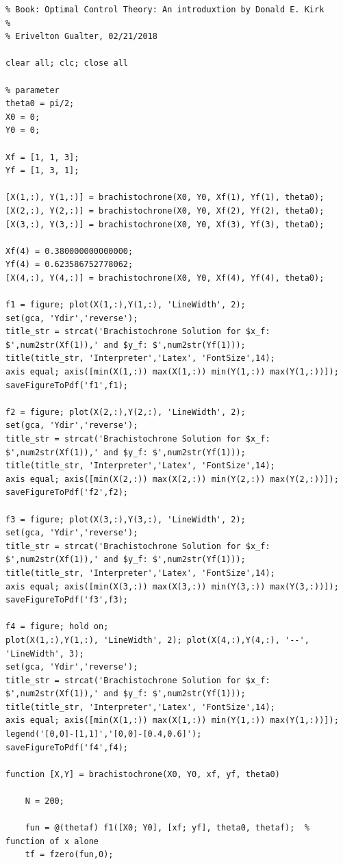\documentclass{article}
\begin{document}
\begin{lstlisting}
% Book: Optimal Control Theory: An introduxtion by Donald E. Kirk
%
% Erivelton Gualter, 02/21/2018

clear all; clc; close all

% parameter
theta0 = pi/2;
X0 = 0; 
Y0 = 0;
    
Xf = [1, 1, 3]; 
Yf = [1, 3, 1];

[X(1,:), Y(1,:)] = brachistochrone(X0, Y0, Xf(1), Yf(1), theta0);
[X(2,:), Y(2,:)] = brachistochrone(X0, Y0, Xf(2), Yf(2), theta0);
[X(3,:), Y(3,:)] = brachistochrone(X0, Y0, Xf(3), Yf(3), theta0);

Xf(4) = 0.380000000000000; 
Yf(4) = 0.623586752778062;
[X(4,:), Y(4,:)] = brachistochrone(X0, Y0, Xf(4), Yf(4), theta0);
    
f1 = figure; plot(X(1,:),Y(1,:), 'LineWidth', 2); 
set(gca, 'Ydir','reverse');
title_str = strcat('Brachistochrone Solution for $x_f: $',num2str(Xf(1)),' and $y_f: $',num2str(Yf(1)));
title(title_str, 'Interpreter','Latex', 'FontSize',14);
axis equal; axis([min(X(1,:)) max(X(1,:)) min(Y(1,:)) max(Y(1,:))]);
saveFigureToPdf('f1',f1);

f2 = figure; plot(X(2,:),Y(2,:), 'LineWidth', 2); 
set(gca, 'Ydir','reverse');
title_str = strcat('Brachistochrone Solution for $x_f: $',num2str(Xf(1)),' and $y_f: $',num2str(Yf(1)));
title(title_str, 'Interpreter','Latex', 'FontSize',14);
axis equal; axis([min(X(2,:)) max(X(2,:)) min(Y(2,:)) max(Y(2,:))]);
saveFigureToPdf('f2',f2);

f3 = figure; plot(X(3,:),Y(3,:), 'LineWidth', 2); 
set(gca, 'Ydir','reverse');
title_str = strcat('Brachistochrone Solution for $x_f: $',num2str(Xf(1)),' and $y_f: $',num2str(Yf(1)));
title(title_str, 'Interpreter','Latex', 'FontSize',14);
axis equal; axis([min(X(3,:)) max(X(3,:)) min(Y(3,:)) max(Y(3,:))]);
saveFigureToPdf('f3',f3);

f4 = figure; hold on; 
plot(X(1,:),Y(1,:), 'LineWidth', 2); plot(X(4,:),Y(4,:), '--', 'LineWidth', 3); 
set(gca, 'Ydir','reverse');
title_str = strcat('Brachistochrone Solution for $x_f: $',num2str(Xf(1)),' and $y_f: $',num2str(Yf(1)));
title(title_str, 'Interpreter','Latex', 'FontSize',14);
axis equal; axis([min(X(1,:)) max(X(1,:)) min(Y(1,:)) max(Y(1,:))]);
legend('[0,0]-[1,1]','[0,0]-[0.4,0.6]');
saveFigureToPdf('f4',f4);

function [X,Y] = brachistochrone(X0, Y0, xf, yf, theta0)

    N = 200;

    fun = @(thetaf) f1([X0; Y0], [xf; yf], theta0, thetaf);  % function of x alone
    tf = fzero(fun,0);


\end{lstlisting}
\end{document}
